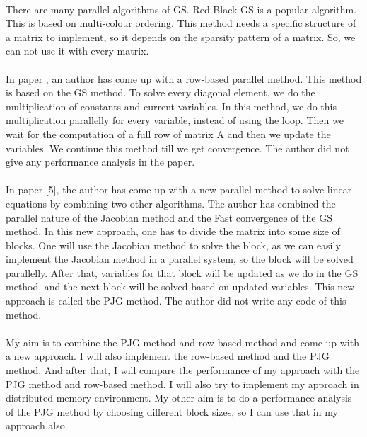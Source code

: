 \documentclass[11pt]{article}       %
\begin{document}
\\There are many parallel algorithms of GS. Red-Black GS is a popular algorithm. \cite{rbgs} This is based on multi-colour ordering. This method needs a specific structure of a matrix to implement, so it depends on the sparsity pattern of a matrix. So, we can not use it with every matrix. 
\\
\\In paper \cite{row-based}, an author has come up with a row-based parallel method. This method is based on the GS method. To solve every diagonal element, we do the multiplication of constants and current variables. In this method, we do this multiplication parallelly for every variable, instead of using the loop. Then we wait for the computation of a full row of matrix A and then we update the variables. We continue this method till we get convergence. The author did not give any performance analysis in the paper.
\\
\\In paper [5], the author has come up with a new parallel method to solve linear equations by combining two other algorithms. The author has combined the parallel nature of the Jacobian method and the Fast convergence of the GS method. In this new approach, one has to divide the matrix into some size of blocks. One will use the Jacobian method to solve the block, as we can easily implement the Jacobian method in a parallel system, so the block will be solved parallelly. After that, variables for that block will be updated as we do in the GS method, and the next block will be solved based on updated variables. This new approach is called the PJG method. The author did not write any code of this method.
\\
\\My aim is to combine the PJG method and row-based method and come up with a new approach. I will also implement the row-based method and the PJG method. And after that, I will compare the performance of my approach with the PJG method and row-based method. I will also try to implement my approach in distributed memory environment. My other aim is to do a performance analysis of the PJG method by choosing different block sizes, so I can use that in my approach also. 


\end{document}
